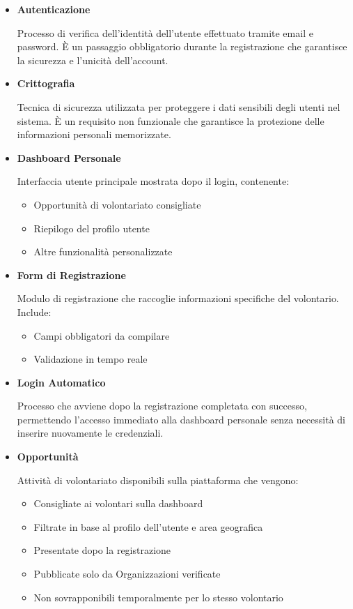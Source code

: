 \begin{itemize}

\item \textbf{Autenticazione}

Processo di verifica dell'identità dell'utente effettuato tramite email e password. È un passaggio obbligatorio durante la registrazione che garantisce la sicurezza e l'unicità dell'account.

\item \textbf{Crittografia}

Tecnica di sicurezza utilizzata per proteggere i dati sensibili degli utenti nel sistema. È un requisito non funzionale che garantisce la protezione delle informazioni personali memorizzate.

\item \textbf{Dashboard Personale}

Interfaccia utente principale mostrata dopo il login, contenente:
\begin{itemize}
    \item Opportunità di volontariato consigliate
    \item Riepilogo del profilo utente
    \item Altre funzionalità personalizzate
\end{itemize}

\item \textbf{Form di Registrazione}

Modulo di registrazione che raccoglie informazioni specifiche del volontario. Include:
\begin{itemize}
    \item Campi obbligatori da compilare
    \item Validazione in tempo reale
\end{itemize}

\item \textbf{Login Automatico}

Processo che avviene dopo la registrazione completata con successo, permettendo l'accesso immediato alla dashboard personale senza necessità di inserire nuovamente le credenziali.

\item \textbf{Opportunità}

Attività di volontariato disponibili sulla piattaforma che vengono:
\begin{itemize}
    \item Consigliate ai volontari sulla dashboard
    \item Filtrate in base al profilo dell'utente e area geografica
    \item Presentate dopo la registrazione
    \item Pubblicate solo da Organizzazioni verificate
    \item Non sovrapponibili temporalmente per lo stesso volontario
\end{itemize}


\end{itemize}
